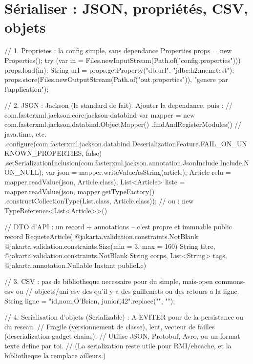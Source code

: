 \section{S\'erialiser : JSON, propri\'et\'es, CSV, objets}

\begin{codejava}
// 1. Proprietes : la config simple, sans dependance
Properties props = new Properties();
try (var in = Files.newInputStream(Path.of("config.properties"))) { props.load(in); }
String url = props.getProperty("db.url", "jdbc:h2:mem:test");
props.store(Files.newOutputStream(Path.of("out.properties")), "genere par l'application");

// 2. JSON : Jackson (le standard de fait). Ajouter la dependance, puis :
//    com.fasterxml.jackson.core:jackson-databind
var mapper = new com.fasterxml.jackson.databind.ObjectMapper()
        .findAndRegisterModules()                       // java.time, etc.
        .configure(com.fasterxml.jackson.databind.DeserializationFeature.FAIL_ON_UNKNOWN_PROPERTIES, false)
        .setSerializationInclusion(com.fasterxml.jackson.annotation.JsonInclude.Include.NON_NULL);
var json = mapper.writeValueAsString(article);
Article relu = mapper.readValue(json, Article.class);
List<Article> liste = mapper.readValue(json, mapper.getTypeFactory()
        .constructCollectionType(List.class, Article.class));   // ou : new TypeReference<List<Article>>() {}

// DTO d'API : un record + annotations -- c'est propre et immuable
public record RequeteArticle(
        @jakarta.validation.constraints.NotBlank @jakarta.validation.constraints.Size(min = 3, max = 160) String titre,
        @jakarta.validation.constraints.NotBlank String corps,
        List<String> tags,
        @jakarta.annotation.Nullable Instant publieLe) { }

// 3. CSV : pas de bibliotheque necessaire pour du simple, mais-open commons-csv ou
//    objects/uni-csv des qu'il y a des guillemets ou des retours a la ligne.
String ligne = "id,nom,\"O'Brien, junior\",42\n".replace("\r", "");

// 4. Serialisation d'objets (Serializable) : A EVITER pour de la persistance ou du reseau.
//    Fragile (versionnement de classe), lent, vecteur de failles (deserialization gadget chains).
//    Utilise JSON, Protobuf, Avro, ou un format texte define par toi.
//    (La serialization reste utile pour RMI/ehcache, et la bibliotheque la remplace ailleurs.)
\end{codejava}

